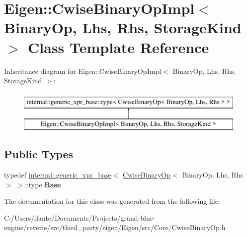 \hypertarget{class_eigen_1_1_cwise_binary_op_impl}{}\section{Eigen\+::Cwise\+Binary\+Op\+Impl$<$ Binary\+Op, Lhs, Rhs, Storage\+Kind $>$ Class Template Reference}
\label{class_eigen_1_1_cwise_binary_op_impl}
Inheritance diagram for Eigen\+::Cwise\+Binary\+Op\+Impl$<$ Binary\+Op, Lhs, Rhs, Storage\+Kind $>$\+:\begin{figure}[H]
\begin{center}
\leavevmode
\includegraphics[height=2.000000cm]{class_eigen_1_1_cwise_binary_op_impl}
\end{center}
\end{figure}
\subsection*{Public Types}
\begin{DoxyCompactItemize}
\item 
\mbox{\label{class_eigen_1_1_cwise_binary_op_impl_a405ac3a82c17151da8476901c29b82fd}} 
typedef \mbox{\hyperlink{struct_eigen_1_1internal_1_1generic__xpr__base}{internal\+::generic\+\_\+xpr\+\_\+base}}$<$ \mbox{\hyperlink{class_eigen_1_1_cwise_binary_op}{Cwise\+Binary\+Op}}$<$ Binary\+Op, Lhs, Rhs $>$ $>$\+::type {\bfseries Base}
\end{DoxyCompactItemize}


The documentation for this class was generated from the following file\+:\begin{DoxyCompactItemize}
\item 
C\+:/\+Users/dante/\+Documents/\+Projects/grand-\/blue-\/engine/reverie/src/third\+\_\+party/eigen/\+Eigen/src/\+Core/Cwise\+Binary\+Op.\+h\end{DoxyCompactItemize}
